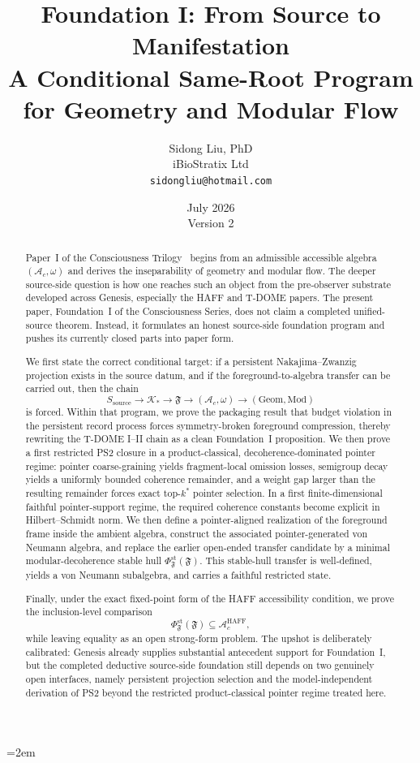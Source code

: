 \documentclass[12pt]{article}
\title{%
  \textbf{Foundation I: From Source to Manifestation}\\
  \textbf{A Conditional Same-Root Program for Geometry and Modular Flow}%
}
\author{
  Sidong Liu, PhD \\
  \small iBioStratix Ltd \\
  \small \texttt{sidongliu@hotmail.com}
}
\date{July 2026\\ \small Version 2}
\theoremstyle{definition}
\theoremstyle{remark}
\begin{document}
\emergencystretch=2em
\raggedbottom
{}

\maketitle

\begin{abstract}
Paper~I of the Consciousness Trilogy~\cite{PaperI} begins from an
admissible accessible algebra \((\mathcal A_c,\omega)\) and derives the
inseparability of geometry and modular flow. The deeper source-side
question is how one reaches such an object from the pre-observer
substrate developed across Genesis, especially the HAFF and T-DOME
papers. The present paper, Foundation~I of the Consciousness Series,
does not claim a completed unified-source theorem. Instead, it
formulates an honest source-side foundation program and pushes its
currently closed parts into paper form.

We first state the correct conditional target: if a persistent
Nakajima--Zwanzig projection exists in the source datum, and if the
foreground-to-algebra transfer can be carried out, then the chain
\[
S_{\mathrm{source}} \to \mathcal K_* \to \mathfrak F \to (\mathcal A_c,\omega)
\to (\mathrm{Geom},\mathrm{Mod})
\]
is forced. Within that program, we prove the packaging result that
budget violation in the persistent record process forces
symmetry-broken foreground compression, thereby rewriting the T-DOME
I--II chain as a clean Foundation~I proposition. We then prove a first
restricted PS2 closure in a product-classical, decoherence-dominated
pointer regime: pointer coarse-graining yields fragment-local omission
losses, semigroup decay yields a uniformly bounded coherence remainder,
and a weight gap larger than the resulting remainder forces exact
top-\(k^*\) pointer selection. In a first finite-dimensional faithful
pointer-support regime, the required coherence constants become
explicit in Hilbert--Schmidt norm. We then define a
pointer-aligned realization of the foreground frame inside the ambient
algebra, construct the associated pointer-generated von Neumann
algebra, and replace the earlier open-ended transfer candidate by a
minimal modular-decoherence stable hull
\(\Phi_{\mathfrak F}^{\mathrm{st}}(\mathfrak F)\). This stable-hull
transfer is well-defined, yields a von Neumann subalgebra, and carries a
faithful restricted state.

Finally, under the exact fixed-point form of the HAFF accessibility
condition, we prove the inclusion-level comparison
\[
\Phi_{\mathfrak F}^{\mathrm{st}}(\mathfrak F)\subseteq
\mathcal A_c^{\mathrm{HAFF}},
\]
while leaving equality as an open strong-form problem. The upshot is
deliberately calibrated: Genesis already supplies substantial antecedent
support for Foundation~I, but the completed deductive source-side
foundation still depends on two genuinely open interfaces, namely
persistent projection selection and the model-independent derivation of
PS2 beyond the restricted product-classical pointer regime treated here.
 \end{abstract}
\end{document}
